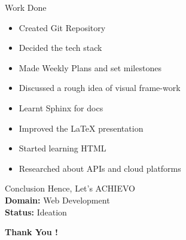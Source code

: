 \documentclass{beamer}
\begin{document}
 \begin{frame}{Work Done}
                \justifying
                \begin{itemize}
                \item  Created Git Repository
                \item  Decided the tech stack
                \item  Made Weekly Plans and set milestones
                \item  Discussed a rough idea of visual frame-work
                \item  Learnt Sphinx for docs
                \item Improved the \LaTeX{} presentation
                \item  Started learning HTML
                \item  Researched about APIs and cloud platforms
                \end{itemize}
        \end{frame}
		

	

	\begin{frame}{Conclusion}
		\justifying
		Hence, Let's ACHIEVO \\ 
 \bigskip
		\textbf{Domain: } Web Development \\
		\textbf{Status: } Ideation \\
		
		\bigskip
		
		\Huge\textbf{Thank You !}
	\end{frame}
\end{document}
